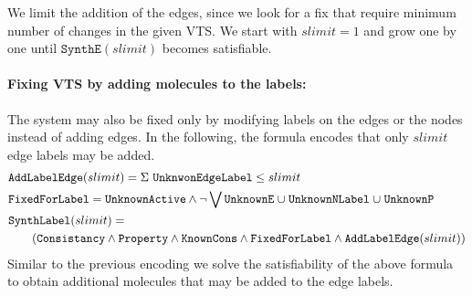 We limit the addition of the edges, since we look for a fix that require minimum number
of changes in the given VTS.
%
We start with $slimit = 1$ and grow one by one until $\texttt{SynthE}(slimit)$
becomes satisfiable.

\paragraph{\bf Fixing VTS by adding molecules to the labels:}
The system may also be fixed only by modifying labels on the edges or the nodes instead
of adding edges.
%
In the following, the formula encodes that only $slimit$ edge labels may be added.
\begin{align*}
  &\texttt{AddLabelEdge}(slimit) = 
    \Sigma~\texttt{UnknwonEdgeLabel}  \leq slimit\\
  & \texttt{FixedForLabel} = \texttt{UnknownActive} \land \lnot \bigvee \texttt{UnknownE} \;{\cup}\;
                    \texttt{UnknownNLabel} \;{\cup}\;
                    \texttt{UnknownP}\\
  &\texttt{SynthLabel}(slimit) = \\
  & \quad\quad
    (  \texttt{Consistancy}\land \texttt{Property} \land
  \texttt{KnownCons} \land \texttt{FixedForLabel} \land \texttt{AddLabelEdge}(slimit) )
\end{align*}
Similar to the previous encoding we solve the satisfiability of the above formula
to obtain additional molecules that may be added to the edge labels.







